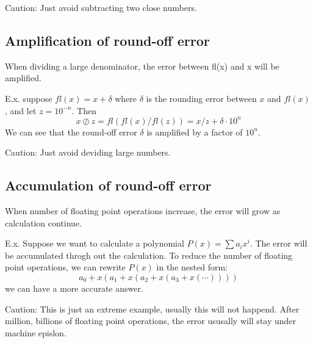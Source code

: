 	Caution: Just avoid subtracting two close numbers.
	
	\subsection{Amplification of round-off error}
	When dividing a large denominator, the error between fl(x) and x will be amplified.
	
	E.x. suppose $fl(x) = x +\delta$ where $\delta$ is the rounding error between $x$ and $fl(x)$, and let $z=10^{-n}$. Then
	\[x\oslash z = fl(fl(x)/fl(z)) = x/z + \delta\cdot 10^n \]
	We can see that the round-off error $\delta$ is amplified by a factor of $10^n$.
	
	Caution: Just avoid deviding large numbers.
	
	\subsection{Accumulation of round-off error} 
	When number of floating point operations increase, the error will grow as calculation continue.
	
	E.x. Suppose we want to calculate a polynomial $P(x) = \sum a_ix^i$. The error will be accumulated throgh out the calculation. To reduce the number of floating point operations, we can rewrite $P(x)$ in the nested form:
	\[a_0+x(a_1+x(a_2+x(a_3+x(\cdots))))\] 
	we can have a more accurate answer.
	
	Caution: This is just an extreme example, usually this will not happend. After million, billions of floating point operations, the error ususally will stay under machine epislon.

